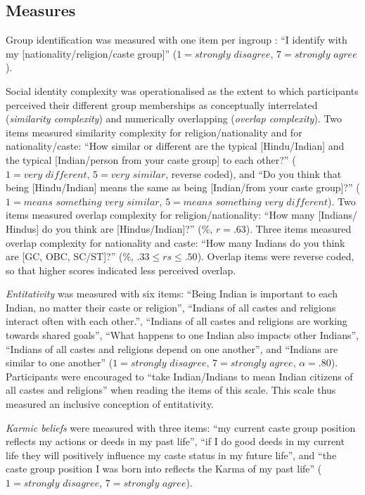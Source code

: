 \documentclass[12pt, a4paper]{article}
\begin{document}
\subsection{Measures}

Group identification was measured with one item per ingroup \cite{postmes_single_2013}: ``I identify with my [nationality/religion/caste group]'' ($1 = \textit{strongly disagree}$, $7 = \textit{strongly agree}$).

Social identity complexity \cite{roccas_social_2002, schmid_antecedents_2009} was operationalised as the extent to which participants perceived their different group memberships as conceptually interrelated (\emph{similarity complexity}) and numerically overlapping (\emph{overlap complexity}). Two items measured similarity complexity for religion/nationality and for nationality/caste: ``How similar or different are the typical [Hindu/Indian] and the typical [Indian/person from your caste group] to each other?'' ($1 = \textit{very different}$, $5 = \textit{very similar}$, reverse coded), and ``Do you think that being [Hindu/Indian] means the same as being [Indian/from your caste group]?'' ($1 = \textit{means something very similar}$, $5 = \textit{means something very different}$).  Two items measured overlap complexity for religion/nationality: ``How many [Indians/ Hindus] do you think are [Hindus/Indian]?” (\%, $r = .63$). Three items measured overlap complexity for nationality and caste: ``How many Indians do you think are [GC, OBC, SC/ST]?'' (\%, $.33 \leq rs \leq .50$). Overlap items were reverse coded, so that higher scores indicated less perceived overlap.

\emph{Entitativity} \cite{lickel_varieties_2000} was measured with six items: ``Being Indian is important to each Indian, no matter their caste or religion'', ``Indians of all castes and religions interact often with each other.'', ``Indians of all castes and religions are working towards shared goals'', ``What happens to one Indian also impacts other Indians'', ``Indians of all castes and religions depend on one another'', and ``Indians are similar to one another'' ($1 = \textit{strongly disagree}$, $7 = \textit{strongly agree}$, $\alpha = .80$). Participants were encouraged to ``take Indian/Indians to mean Indian citizens of all castes and religions'' when reading the items of this scale. This scale thus measured an inclusive conception of entitativity.

\emph{Karmic beliefs} \cite{cotterill_ideological_2014} were measured with three items: ``my current caste group position reflects
my actions or deeds in my past life'', ``if I do good deeds in my current life they will positively influence my caste status in my future life'', and ``the caste group position I was born into reflects the Karma of my past life'' ($1 = \textit{strongly disagree}$, $7 = \textit{strongly agree}$).
\end{document}
